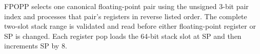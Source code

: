 FPOPP selects one canonical floating-point pair using the unsigned 3-bit pair index and processes that pair's registers in reverse listed order. The complete two-slot stack range is validated and read before either floating-point register or SP is changed. Each register pop loads the 64-bit stack slot at SP and then increments SP by 8.
